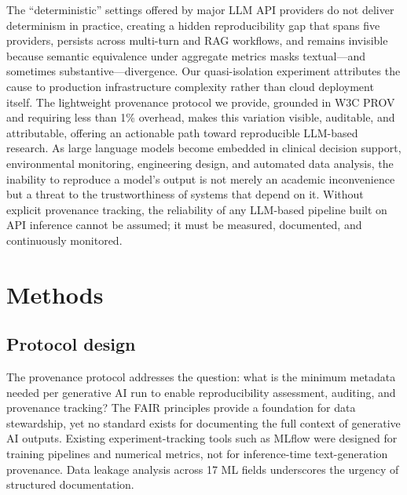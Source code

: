 \documentclass[sn-nature]{sn-jnl}
\begin{document}
The ``deterministic'' settings offered by major LLM API providers do not deliver determinism in practice, creating a hidden reproducibility gap that spans five providers, persists across multi-turn and RAG workflows, and remains invisible because semantic equivalence under aggregate metrics masks textual---and sometimes substantive---divergence.
Our quasi-isolation experiment attributes the cause to production infrastructure complexity rather than cloud deployment itself.
The lightweight provenance protocol we provide, grounded in W3C PROV and requiring less than 1\% overhead, makes this variation visible, auditable, and attributable, offering an actionable path toward reproducible LLM-based research.
As large language models become embedded in clinical decision support, environmental monitoring, engineering design, and automated data analysis, the inability to reproduce a model's output is not merely an academic inconvenience but a threat to the trustworthiness of systems that depend on it.
Without explicit provenance tracking, the reliability of any LLM-based pipeline built on API inference cannot be assumed; it must be measured, documented, and continuously monitored.


\section{Methods}\label{sec:methods}

\subsection{Protocol design}\label{subsec:protocol}

The provenance protocol addresses the question: what is the minimum metadata needed per generative AI run to enable reproducibility assessment, auditing, and provenance tracking?
The FAIR principles\cite{wilkinson2016fair} provide a foundation for data stewardship, yet no standard exists for documenting the full context of generative AI outputs.
Existing experiment-tracking tools such as MLflow\cite{zaharia2018accelerating} were designed for training pipelines and numerical metrics, not for inference-time text-generation provenance.
Data leakage analysis across 17 ML fields\cite{kapoor2023leakage} underscores the urgency of structured documentation.
\end{document}
